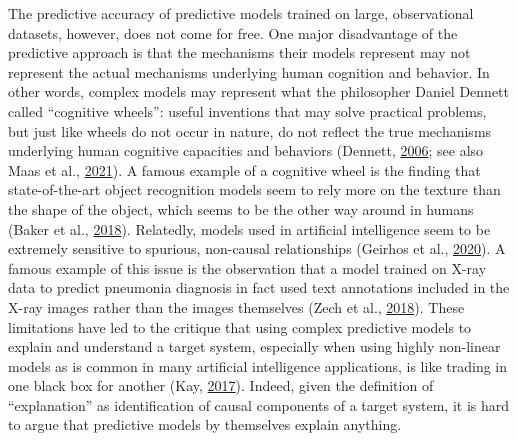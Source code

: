 \documentclass[11pt,american,a4paper,oneside,]{memoir} %
\begin{document}
The predictive accuracy of predictive models trained on large, observational datasets, however, does not come for free. One major disadvantage of the predictive approach is that the mechanisms their models represent may not represent the actual mechanisms underlying human cognition and behavior. In other words, complex models may represent what the philosopher Daniel Dennett called ``cognitive wheels'': useful inventions that may solve practical problems, but just like wheels do not occur in nature, do not reflect the true mechanisms underlying human cognitive capacities and behaviors (Dennett, \protect\hyperlink{ref-Dennett2006-el}{2006}; see also Maas et al., \protect\hyperlink{ref-Van_der_Maas2021-rx}{2021}). A famous example of a cognitive wheel is the finding that state-of-the-art object recognition models seem to rely more on the texture than the shape of the object, which seems to be the other way around in humans (Baker et al., \protect\hyperlink{ref-baker2018deep}{2018}). Relatedly, models used in artificial intelligence seem to be extremely sensitive to spurious, non-causal relationships (Geirhos et al., \protect\hyperlink{ref-Geirhos2020-af}{2020}). A famous example of this issue is the observation that a model trained on X-ray data to predict pneumonia diagnosis in fact used text annotations included in the X-ray images rather than the images themselves (Zech et al., \protect\hyperlink{ref-Zech2018-bq}{2018}). These limitations have led to the critique that using complex predictive models to explain and understand a target system, especially when using highly non-linear models as is common in many artificial intelligence applications, is like trading in one black box for another (Kay, \protect\hyperlink{ref-Kay2017-vr}{2017}). Indeed, given the definition of ``explanation'' as identification of causal components of a target system, it is hard to argue that predictive models by themselves explain anything.
\end{document}
